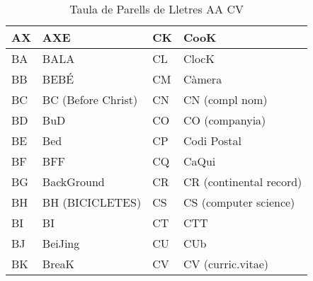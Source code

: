 \begin{table}[h]
\begin{tabular}{|l|l|l|l|}
    AX & AXE                & CK & CooK                    \\ \hline
    BA & BALA               & CL & ClocK                   \\ \hline
    BB & BEBÉ               & CM & Càmera                  \\ \hline
    BC & BC (Before Christ) & CN & CN (compl nom)          \\ \hline
    BD & BuD                & CO & CO (companyia)          \\ \hline
    BE & Bed                & CP & Codi Postal             \\ \hline
    BF & BFF                & CQ & CaQui                   \\ \hline
    BG & BackGround         & CR & CR (continental record) \\ \hline
    BH & BH (BICICLETES)    & CS & CS (computer science)   \\ \hline
    BI & BI                 & CT & CTT                     \\ \hline
    BJ & BeiJing            & CU & CUb                     \\ \hline
    BK & BreaK              & CV & CV (curric.vitae)       \\ \hline
    \end{tabular}
    \caption{Taula de Parells de Lletres AA \rightarrow CV}
    \label{tla:lletres-1}
    \end{table}

